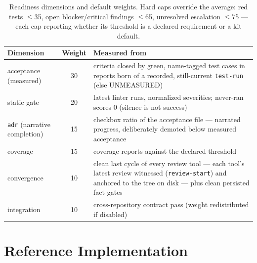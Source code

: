 \documentclass[11pt]{article}
\begin{document}
\begin{table}[t]
\centering
\small
\begin{tabular}{@{}lcp{8.6cm}@{}}
\toprule
\textbf{Dimension} & \textbf{Weight} & \textbf{Measured from} \\
\midrule
acceptance (measured) & 30 & criteria closed by green, name-tagged test cases
in reports born of a recorded, still-current \texttt{test-run} (else UNMEASURED) \\
static gate & 20 & latest linter runs, normalized severities; never-ran scores
0 (silence is not success) \\
\texttt{adr} (narrative completion) & 15 & checkbox ratio of the acceptance
file --- narrated progress, deliberately demoted below measured acceptance \\
coverage & 15 & coverage reports against the declared threshold \\
convergence & 10 & clean last cycle of every review tool --- each tool's latest
review witnessed (\texttt{review-start}) and anchored to the tree on disk --- plus
clean persisted fact gates \\
integration & 10 & cross-repository contract pass (weight redistributed if
disabled) \\
\bottomrule
\end{tabular}
\caption{Readiness dimensions and default weights. Hard caps override the
average: red tests $\le$35, open blocker/critical findings $\le$65, unresolved
escalation $\le$75 --- each cap reporting whether its threshold is a declared
requirement or a kit default.}
\label{tab:readiness}
\end{table}

\section{Reference Implementation}\label{sec:impl}
\end{document}
